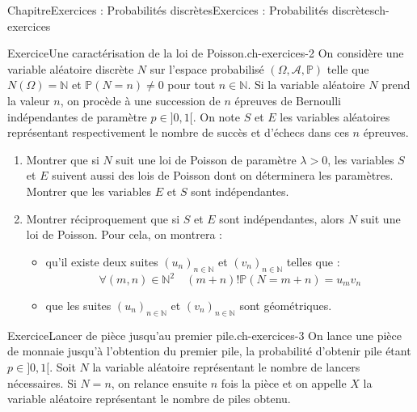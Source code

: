 \documentclass[twoside,10pt,]{book}
\numberwithin{equation}{chapter}
\newcommand{\N}{\mathbb N}
\renewcommand{\Pr}{\mathbb P}
\begin{document}
\raggedbottom
%
%
\typeout{************************************************}
\typeout{************************************************}
%
\begin{chapterptx}{Chapitre}{Exercices : Probabilités discrètes}{}{Exercices : Probabilités discrètes}{}{}{ch-exercices}
\renewcommand*{\chaptername}{Chapitre}
\begin{inlineexercise}{Exercice}{Une caractérisation de la loi de Poisson.}{ch-exercices-2}%
On considère une variable aléatoire discrète \(N\) sur l'espace probabilisé \((\Omega, \mathcal{A}, \Pr)\) telle que \(N(\Omega)=\N\) et \(\Pr(N=n) \neq 0\) pour tout \(n \in \N\). Si la variable aléatoire \(N\) prend la valeur \(n\), on procède à une succession de \(n\) épreuves de Bernoulli indépendantes de paramètre \(p \in] 0,1[\). On note \(S\) et \(E\) les variables aléatoires représentant respectivement le nombre de succès et d'échecs dans ces \(n\) épreuves.%
\begin{enumerate}[font=\bfseries,label=(\alph*),ref=\alph*]%
\item{}Montrer que si \(N\) suit une loi de Poisson de paramètre \(\lambda>0\), les variables \(S\) et \(E\) suivent aussi des lois de Poisson dont on déterminera les paramètres. Montrer que les variables \(E\) et \(S\) sont indépendantes.%
\item{}Montrer réciproquement que si \(S\) et \(E\) sont indépendantes, alors \(N\) suit une loi de Poisson. Pour cela, on montrera :%
%
\begin{itemize}[label=\textbullet]
\item{}qu'il existe deux suites \(\left(u_{n}\right)_{n \in \N}\) et \(\left(v_{n}\right)_{n \in \N}\) telles que :%
\begin{equation*}
\forall(m, n) \in \N^{2} \quad(m+n) ! \Pr(N=m+n)=u_{m} v_{n}
\end{equation*}
%
\item{}que les suites \(\left(u_{n}\right)_{n \in \N}\) et \(\left(v_{n}\right)_{n \in \N}\) sont géométriques.%
\end{itemize}
\end{enumerate}%
\end{inlineexercise}%
\begin{inlineexercise}{Exercice}{Lancer de pièce jusqu'au premier pile.}{ch-exercices-3}%
On lance une pièce de monnaie jusqu'à l'obtention du premier pile, la probabilité d'obtenir pile étant \(p \in] 0,1[\). Soit \(N\) la variable aléatoire représentant le nombre de lancers nécessaires. Si \(N=n\), on relance ensuite \(n\) fois la pièce et on appelle \(X\) la variable aléatoire représentant le nombre de piles obtenu.%

\end{inlineexercise}
\end{chapterptx}
\end{document}
